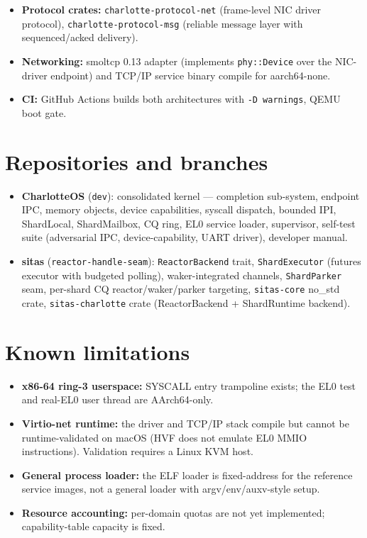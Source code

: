 \begin{itemize}
        by the loader contract. ShardParker seam (CQ\_WAIT/CQ\_WAKE) retires
        busy-waiting; ShardExecutor implements budgeted polling with task
        wakeup from drained events.
    \item \textbf{Protocol crates:} \texttt{charlotte-protocol-net}
        (frame-level NIC driver protocol), \texttt{charlotte-protocol-msg}
        (reliable message layer with sequenced/acked delivery).
    \item \textbf{Networking:} smoltcp 0.13 adapter (implements
        \texttt{phy::Device} over the NIC-driver endpoint) and TCP/IP service
        binary compile for aarch64-none.
    \item \textbf{CI:} GitHub Actions builds both architectures with
        \texttt{-D warnings}, QEMU boot gate.
\end{itemize}

\section{Repositories and branches}

\begin{itemize}
    \item \textbf{CharlotteOS} (\texttt{dev}): consolidated kernel ---
        completion sub-system, endpoint IPC, memory objects, device
        capabilities, syscall dispatch, bounded IPI, ShardLocal, ShardMailbox,
        CQ ring, EL0 service loader, supervisor, self-test suite (adversarial
        IPC, device-capability, UART driver), developer manual.
    \item \textbf{sitas} (\texttt{reactor-handle-seam}): \texttt{ReactorBackend}
        trait, \texttt{ShardExecutor} (futures executor with budgeted polling),
        waker-integrated channels, \texttt{ShardParker} seam, per-shard CQ
        reactor/waker/parker targeting, \texttt{sitas-core} no\_std crate,
        \texttt{sitas-charlotte} crate (ReactorBackend + ShardRuntime backend).
\end{itemize}

\section{Known limitations}

\begin{itemize}
    \item \textbf{x86-64 ring-3 userspace:} SYSCALL entry trampoline exists; the
        EL0 test and real-EL0 user thread are AArch64-only.
    \item \textbf{Virtio-net runtime:} the driver and TCP/IP stack compile but
        cannot be runtime-validated on macOS (HVF does not emulate EL0 MMIO
        instructions). Validation requires a Linux KVM host.
    \item \textbf{General process loader:} the ELF loader is fixed-address for
        the reference service images, not a general loader with
        argv/env/auxv-style setup.
    \item \textbf{Resource accounting:} per-domain quotas are not yet
        implemented; capability-table capacity is fixed.
\end{itemize}


